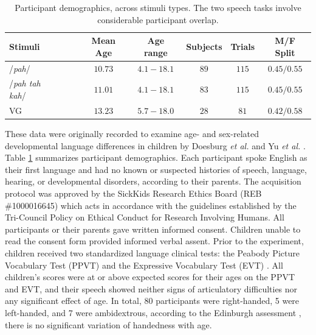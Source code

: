 \documentclass[fleqn,10pt]{wlscirep}
\begin{document}
\begin{table}[h]
  \centering
  \begin{tabular}{ l@{}c c c c c }
    \toprule
    \textbf{Stimuli} & \textbf{Mean Age} & \textbf{Age range} & \textbf{Subjects} & \textbf{Trials}  & \textbf{M/F Split} \\
    \midrule
    /{\em pah}/~~~                    & $10.73$ & $4.1-18.1$   &   $89$   &   $115$   &   $0.45/0.55$ \\
    /{\em pah tah kah}/~~~            & $11.01$ & $4.1-18.1$   &   $83$   &   $115$   &   $0.45/0.55$ \\
    VG~~~                             & $13.23$ & $5.7-18.0$   &   $28$   &   $81$    &   $0.42/0.58$  \\
    \bottomrule
  \end{tabular}
  \caption{Participant demographics, across stimuli types. The two speech tasks involve considerable participant overlap.}
  \label{tab:subjects}
\end{table}
These data were originally recorded to examine age- and sex-related developmental language differences in children by Doesburg {\em et al.} \cite{Doesburg2016} and Yu {\em et al.} \cite{Yu2014}. Table \ref{tab:subjects} summarizes participant demographics. Each participant spoke English as their first language and had no known or suspected histories of speech, language, hearing, or developmental disorders, according to their parents. The acquisition protocol was approved by the SickKids Research Ethics Board (REB \#1000016645) which acts in accordance with the guidelines established by the Tri-Council Policy on Ethical Conduct for Research Involving Humans. All participants or their parents gave written informed consent. Children unable to read the consent form provided informed verbal assent. Prior to the experiment, children received two standardized language clinical tests: the Peabody Picture Vocabulary Test (PPVT) \cite{Dunn97} and the Expressive Vocabulary Test (EVT) \cite{EVT}. All children's scores were at or above expected scores for their ages on the PPVT and EVT, and their speech showed neither signs of articulatory difficulties nor any significant effect of age. In total, 80 participants were right-handed, 5 were left-handed, and 7 were ambidextrous, according to the Edinburgh assessment \cite{Oldfield1971}, there is no significant variation of handedness with age. 
\end{document}
